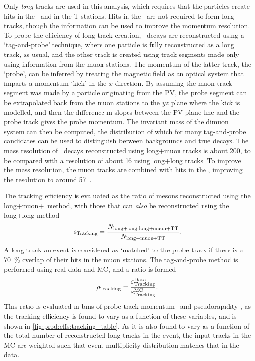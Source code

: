 Only \emph{long} tracks are used in this analysis, which requires that the 
particles create hits in the \velo\ and in the T stations.
Hits in the \ttracker\ are not required to form long tracks, though the 
information can be used to improve the momentum resolution.
To probe the efficiency of long track creation, \JpsiTomumu\ decays are 
reconstructed using a `tag-and-probe' technique, where one particle is fully 
reconstructed as a long track, as usual, and the other track is created using 
track segments made only using information from the muon stations.
The momentum of the latter track, the `probe', can be inferred by treating the 
magnetic field as an optical system that imparts a momentum `kick' in the $x$ 
direction.
By assuming the muon track segment was made by a particle originating from the 
\ac{PV}, the probe segment can be extrapolated back from the muon stations to 
the $yz$ plane where the kick is modelled, and then the difference in slopes 
between the \ac{PV}-plane line and the probe track gives the probe momentum.
The invariant mass of the dimuon system can then be computed, the distribution 
of which for many tag-and-probe candidates can be used to distinguish between 
backgrounds and true \PJpsi decays.
The mass resolution of \JpsiTomumu\ decays reconstructed using long+muon tracks 
is about \SI{200}{\MeVcc}, to be compared with a resolution of about 
\SI{16}{\MeVcc} using long+long tracks.
To improve the mass resolution, the muon tracks are combined with hits in the 
\ttracker, improving the resolution to around 
\SI{57}{\MeVcc}~\cite{Aaij:2014pwa,DeCian:2013zua}.

The tracking efficiency is evaluated as the ratio of \PJpsi mesons 
reconstructed using the long+muon+\ttracker\ method, with those that can 
\emph{also} be reconstructed using the long+long method
\begin{equation}
  \eff_{\text{Tracking}} = 
  \frac{%
    N_{\text{long+long}|\text{long+muon+TT}}
  }{%
    N_{\text{long+muon+TT}}
  }.
  \label{eqn:prod:effs:tracking_eff}
\end{equation}
A long track an event is considered as `matched' to the probe track if there is 
a \SI{70}{\percent} overlap of their hits in the muon stations.
The tag-and-probe method is performed using real data and \ac{MC}, and a ratio 
is formed
\begin{equation}
  \efftracking = \frac{%
    \eff_{\text{Tracking}}^{\text{Data}}
  }{%
    \eff_{\text{Tracking}}^{\text{MC}}
  }.
  \label{eqn:prod:effs:tracking_ratio}
\end{equation}
This ratio is evaluated in bins of probe track momentum \ptot\ and 
pseudorapidity \Eta, as the tracking efficiency is found to vary as a function 
of these variables, and is shown in \cref{fig:prod:effs:tracking_table}.
As it is also found to vary as a function of the total number of reconstructed 
long tracks in the event, the input tracks in the \ac{MC} are weighted such 
that event multiplicity distribution matches that in the data.

